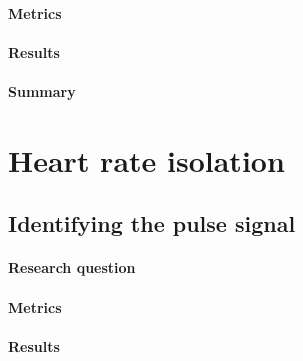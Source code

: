 \paragraph{Metrics}

\paragraph{Results}

\paragraph{Summary}


\section{Heart rate isolation}
\subsection{Identifying the pulse signal}
\label{section:bss}
\paragraph{Research question}
\paragraph{Metrics}
\paragraph{Results}
